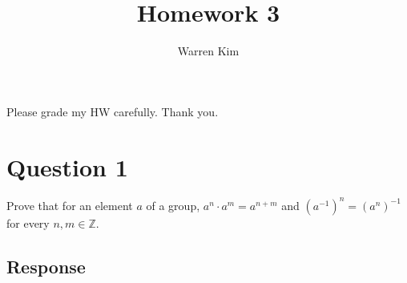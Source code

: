 \documentclass[13pt]{article}
\title{Homework 3}
\author{Warren Kim}
\begin{document}
\maketitle

\begin{center}Please grade my HW carefully. Thank you.\end{center}

\newpage
\section*{Question 1}
Prove that for an element $a$ of a group, $a^n \cdot a^m = a^{n + m}$ and $\left(a^{-1}\right)^n =
\left(a^n\right)^{-1}$ for every $n, m \in \mathbb{Z}$.

\subsection*{Response}
\end{document}
